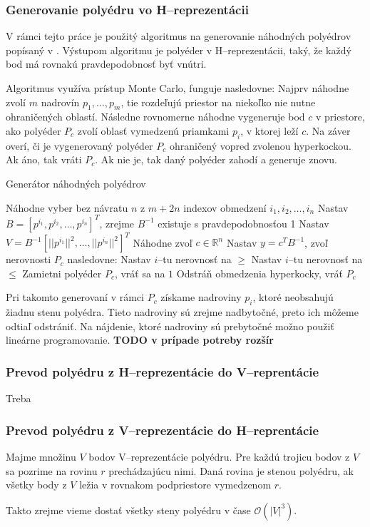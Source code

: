 \subsubsection{Generovanie polyédru vo H--reprezentácii}
V rámci tejto práce je použitý algoritmus na generovanie náhodných polyédrov popísaný v \cite{may}. Výstupom algoritmu je polyéder v H--reprezentácii, taký, že každý bod má rovnakú pravdepodobnosť byť vnútri. 

Algoritmus využíva prístup Monte Carlo, funguje nasledovne: Najprv náhodne zvolí $m$ nadrovín $p_1, \dots, p_m$, tie rozdeľujú priestor na niekoľko nie nutne ohraničených oblastí.
Následne rovnomerne náhodne vygeneruje bod $c$ v priestore, ako polyéder $P_c$ zvolí oblasť vymedzenú priamkami $p_i$, v ktorej leží $c$.
Na záver overí, či je vygenerovaný polyéder $P_c$ ohraničený vopred zvolenou hyperkockou. Ak áno, tak vráti $P_c$. Ak nie je, tak daný polyéder zahodí a generuje znovu.

\begin{algorithm}[H]
	\caption{Generátor náhodných polyédrov \cite{may}}
	\label{generator-polyedrov}
	\begin{algorithmic}[1]
		\State Náhodne vyber bez návratu $n$ z $m+2n$ indexov obmedzení $i_1, i_2, \dots, i_n$
		\State Nastav $B=[p^{i_1}, p^{i_2}, \dots, p^{i_n}]^T$, zrejme $B^{-1}$ existuje s pravdepodobnosťou 1
		\State Nastav $V=B^{-1}[||p^{i_1}||^2, \dots, ||p^{i_n}||^2]^T$
		\State Náhodne zvoľ $c \in \mathbb{R}^n$
		\State Nastav $y=c^TB^{-1}$, zvoľ nerovnosti $P_c$ nasledovne:
				\State Nastav $i$--tu nerovnosť na $\ge$
			\Else
				\State Nastav $i$--tu nerovnosť na $\le$
			\EndIf
		\EndFor
			\State Zamietni polyéder $P_c$, vráť sa na $1$
		\Else
			\State Odstráň obmedzenia hyperkocky, vráť $P_c$
		\EndIf
	\end{algorithmic}
\end{algorithm}

Pri takomto generovaní v rámci $P_c$ získame nadroviny $p_i$, ktoré neobsahujú žiadnu stenu polyédra. Tieto nadroviny sú zrejme nadbytočné, preto ich môžeme odtiaľ odstrániť.
Na nájdenie, ktoré nadroviny sú prebytočné možno použiť lineárne programovanie. \textbf{TODO v prípade potreby rozšír}


\subsubsection{Prevod polyédru z H--reprezentácie do V--reprentácie}

Treba

\subsubsection{Prevod polyédru z V--reprezentácie do H--reprentácie}

Majme množinu $V$ bodov V--reprezentácie polyédru. Pre každú trojicu bodov z $V$ sa pozrime na rovinu $r$ prechádzajúcu nimi. Daná rovina je stenou polyédru, ak všetky body z $V$ ležia v rovnakom podpriestore vymedzenom $r$.

Takto zrejme vieme dostať všetky steny polyédru v čase $\mathcal{O}(|V|^3)$.
